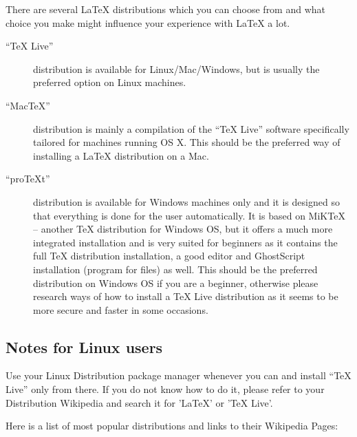 \documentclass[
    draft
]{scrartcl}
\newcommand{\MiKTeX}{MiK\TeX}
\newcommand{\MacTeX}{Mac\TeX}
\begin{document}
%
There are several \LaTeX{} distributions which you can choose from and what
    choice you make might influence your experience with \LaTeX{} a lot.
%
\begin{description}
    \item[``\TeX{} Live''] distribution is available for Linux/Mac/Windows, but
            is usually the preferred option on Linux machines.
    \item[``\MacTeX{}''] distribution is mainly a compilation of the
            ``\TeX{} Live'' software specifically tailored for machines running
            OS X. 
        This should be the preferred way of installing a \LaTeX{} distribution
            on a Mac.
    \item[``pro\TeX{}t''] distribution is available for Windows machines only and
            it is designed so that everything is done for the user
            automatically. 
        It is based on \MiKTeX{} -- another \TeX{} distribution for Windows OS,
            but it offers a much more integrated installation and is very suited
            for beginners as it contains the full \TeX{} distribution
            installation, a good editor and GhostScript installation (program
            for  files) as well.
        This should be the preferred distribution on Windows OS if you are a
        beginner, otherwise please research ways of how to install a
        \TeX{} Live distribution as it seems to be more secure and faster in
        some occasions. 
\end{description}

\subsection{Notes for Linux users}

Use your Linux Distribution package manager whenever you can and install
``\TeX{} Live'' only from there. If you do not know how to do it, please refer to
your Distribution Wikipedia and search it for 'LaTeX' or 'TeX Live'.

Here is a list of most popular distributions and links to their Wikipedia Pages:
\end{document}

